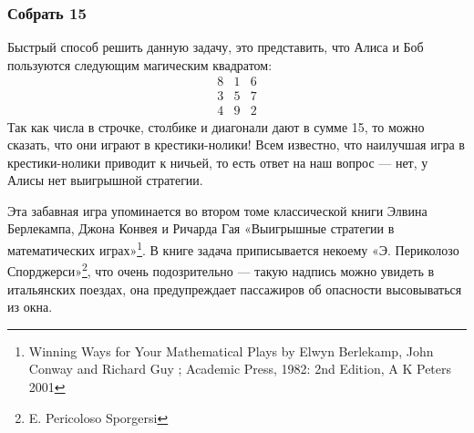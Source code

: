 

\subsubsection*{Собрать 15} %



Быстрый способ решить данную задачу,  это представить, что Алиса и Боб пользуются следующим магическим квадратом:
$$
\begin{matrix}
8&1&6\\
3&5&7\\
4&9&2
\end{matrix}
$$
Так как числа в строчке, столбике и диагонали дают в сумме 15, то можно сказать, что они играют в крестики-нолики!  
Всем известно, что наилучшая игра в крестики-нолики приводит к ничьей,
то есть ответ на наш вопрос --- нет, у Алисы нет выигрышной стратегии.
\heart


Эта забавная игра упоминается во втором томе классической книги Элвина Берлекампа,  Джона Конвея и Ричарда Гая  «Выигрышные стратегии в математических играх»\footnote{Winning Ways for Your Mathematical Plays  by Elwyn Berlekamp, John Conway and Richard Guy ;   Academic Press, 1982: 2nd Edition, A K Peters 2001}. В книге  задача приписывается некоему «Э. Периколозо Спорджерси»\footnote{E. Pericoloso Sporgersi}, что очень подозрительно ---
такую надпись
можно увидеть в итальянских поездах, она предупреждает пассажиров об опасности высовываться из окна.

